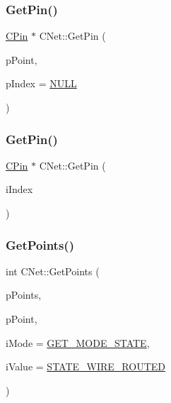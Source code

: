 \subsubsection{\texorpdfstring{GetPin()}{GetPin()}\hspace{0.1cm}{\footnotesize\ttfamily [2/3]}}
{\footnotesize\ttfamily \mbox{\hyperlink{classCPin}{C\+Pin}} $\ast$ C\+Net\+::\+Get\+Pin (\begin{DoxyParamCaption}\item[{\mbox{\hyperlink{classCPoint}{C\+Point}} $\ast$}]{p\+Point,  }\item[{int $\ast$}]{p\+Index = {\ttfamily \mbox{\hyperlink{BoxRouter_8h_a070d2ce7b6bb7e5c05602aa8c308d0c4}{N\+U\+LL}}} }\end{DoxyParamCaption})}

\mbox{\label{classCNet_afa01af65ac2f23050bab801b844034ce}} 
\subsubsection{\texorpdfstring{GetPin()}{GetPin()}\hspace{0.1cm}{\footnotesize\ttfamily [3/3]}}
{\footnotesize\ttfamily \mbox{\hyperlink{classCPin}{C\+Pin}} $\ast$ C\+Net\+::\+Get\+Pin (\begin{DoxyParamCaption}\item[{int}]{i\+Index }\end{DoxyParamCaption})}

\mbox{\label{classCNet_a72e98de5efdbafd034130d0711de4951}} 
\subsubsection{\texorpdfstring{GetPoints()}{GetPoints()}}
{\footnotesize\ttfamily int C\+Net\+::\+Get\+Points (\begin{DoxyParamCaption}\item[{vector$<$ \mbox{\hyperlink{classCPoint}{C\+Point}} $\ast$ $>$ $\ast$}]{p\+Points,  }\item[{\mbox{\hyperlink{classCPoint}{C\+Point}} $\ast$}]{p\+Point,  }\item[{int}]{i\+Mode = {\ttfamily \mbox{\hyperlink{BoxRouter_8h_a6f72f2cc9dd31793dd832ccfb2547de4}{G\+E\+T\+\_\+\+M\+O\+D\+E\+\_\+\+S\+T\+A\+TE}}},  }\item[{int}]{i\+Value = {\ttfamily \mbox{\hyperlink{BoxRouter_8h_a4bee041256f62f94c8f451efa0aaabf9}{S\+T\+A\+T\+E\+\_\+\+W\+I\+R\+E\+\_\+\+R\+O\+U\+T\+ED}}} }\end{DoxyParamCaption})}

